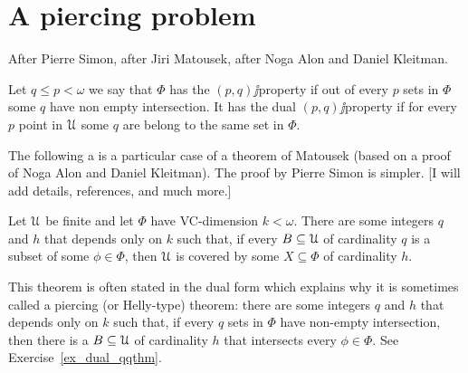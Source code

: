 \documentclass[sputnik.tex]{subfiles}
\begin{document}
\def\vc{{\footnotesize VC}}
\def\nip{{\footnotesize NIP}}


\def\medrel#1{\parbox[t]{6ex}{$\displaystyle\hfil #1$}}
\def\ceq#1#2#3{\parbox[t]{25ex}{$\displaystyle #1$}\medrel{#2}{$\displaystyle #3$}}

\def\mr{\color{brown}}
\def\gr{\color{green}}

\chapter{A piercing problem}\label{qq}

After Pierre Simon, after Jiri Matousek, after Noga Alon and Daniel Kleitman.

Let $q\le p<\omega$ we say that $\Phi$ has the $(p,q)\jj$property if out of every $p$ sets in $\Phi$ some $q$ have non empty intersection.
It has the dual $(p,q)\jj$property if for every $p$ point in $\EuScript U$ some $q$ are belong to the same set in $\Phi$.


The following a is a particular case of a theorem of  Matousek (based on a proof of Noga Alon and Daniel Kleitman).
The proof by Pierre Simon is simpler.
[I will add details, references, and much more.]

\begin{theorem}\label{thm_qq}
Let $\EuScript U$ be finite and let $\Phi$ have \vc-dimension $k<\omega$.
There are some integers $q$ and $h$ that depends only on $k$ such that, if every $B\subseteq\EuScript U$ of cardinality $q$ is a subset of some $\phi\in\Phi$, then $\EuScript U$ is covered by some $X\subseteq\Phi$ of cardinality $h$.
\end{theorem}

This theorem is often stated in the dual form which explains why it is sometimes called a piercing (or Helly-type) theorem: there are some integers $q$ and $h$ that depends only on $k$ such that, if every $q$ sets in $\Phi$ have non-empty intersection, then there is a $B\subseteq\EuScript U$ of cardinality $h$ that intersects every $\phi\in\Phi$.
See Exercise~\ref{ex_dual_qqthm}.
\end{document}

